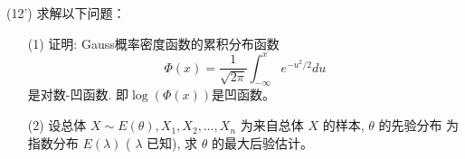 \documentclass[12pt,a4paper,openany,twoside]{ctexbook}
\begin{document}
\begin{exercise}(12')
	求解以下问题：
\begin{itemize}
	\item [(1)] 证明: Gauss概率密度函数的累积分布函数
	\begin{displaymath}
		\Phi(x)=\frac{1}{\sqrt{2\pi}}\int^{x}_{-\infty}e^{-u^{2}/2}du
	\end{displaymath}
	是对数-凹函数. 即$ \log(\Phi(x)) $是凹函数。
	\item [(2)] 设总体 $X \sim E(\theta), X_{1}, X_{2}, \ldots, X_{n}$ 为来自总体 $X$ 的样本, $\theta$ 的先验分布
	为指数分布 $E(\lambda)$ ( $\lambda$ 已知), 求 $\theta$ 的最大后验估计。
\end{itemize}

\end{exercise}
%	
%	
\end{document}
